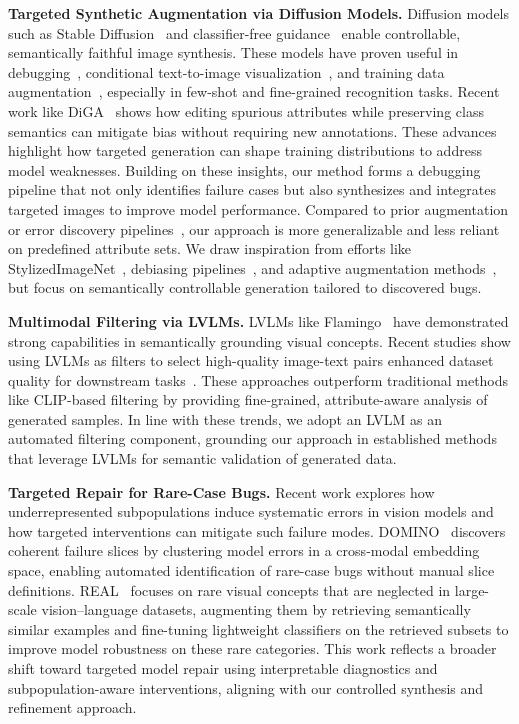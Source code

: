 \documentclass[10pt]{article} %
\begin{document}
\noindent\textbf{Targeted Synthetic Augmentation via Diffusion Models.}
Diffusion models such as Stable Diffusion~\citep{rombach2022high} and classifier-free guidance~\citep{ho2022classifierfree} enable controllable, semantically faithful image synthesis. These models have proven useful in debugging~\citep{casper2022robust, fang2024data, huang2024data}, conditional text-to-image visualization~\citep{augustin2022diffusion, boreiko2022sparse}, and training data augmentation~\citep{trabucco2023effective, dunlap2023diversify}, especially in few-shot and fine-grained recognition tasks. Recent work like DiGA~\citep{zhang2024distributionally} shows how editing spurious attributes while preserving class semantics can mitigate bias without requiring new annotations. These advances highlight how targeted generation can shape training distributions to address model weaknesses. Building on these insights, our method forms a  debugging pipeline that not only identifies failure cases but also synthesizes and integrates targeted images to improve model performance. Compared to prior augmentation or error discovery pipelines~\citep{fang2024data, huang2024data, chen2023hibug}, our approach is more generalizable and less reliant on predefined attribute sets. We draw inspiration from efforts like StylizedImageNet~\citep{geirhos2019imagenet}, debiasing pipelines~\citep{jin2021background}, and adaptive augmentation methods~\citep{mikolajczyk2023targeted, zhao2022adaptive, wang2024domain}, but focus on semantically controllable generation tailored to discovered bugs. 

\noindent\textbf{Multimodal Filtering via LVLMs.} LVLMs like Flamingo~\citep{alayrac2022flamingo} have demonstrated strong capabilities in semantically grounding visual concepts. Recent studies show using LVLMs as filters to select high-quality image-text pairs enhanced dataset quality for downstream tasks~\citep{wang2024finetuned, li2024self}. These approaches outperform traditional methods like CLIP-based filtering by providing fine-grained, attribute-aware analysis of generated samples. In line with these trends, we adopt an LVLM as an automated filtering component, grounding our approach in established methods that leverage LVLMs for semantic validation of generated data. 

\noindent\textbf{Targeted Repair for Rare-Case Bugs.}  
Recent work explores how underrepresented subpopulations induce systematic errors in vision models and how targeted interventions can mitigate such failure modes. DOMINO~\citep{eyuboglu2022rare} discovers coherent failure slices by clustering model errors in a cross‑modal embedding space, enabling automated identification of rare-case bugs without manual slice definitions.
REAL~\citep{parashar2024neglected} focuses on rare visual concepts that are neglected in large-scale vision--language datasets, augmenting them by retrieving semantically similar examples and fine-tuning lightweight classifiers on the retrieved subsets to improve model robustness on these rare categories.
This work reflects a broader shift toward targeted model repair using interpretable diagnostics and subpopulation-aware interventions, aligning with our controlled synthesis and refinement approach.
\end{document}
